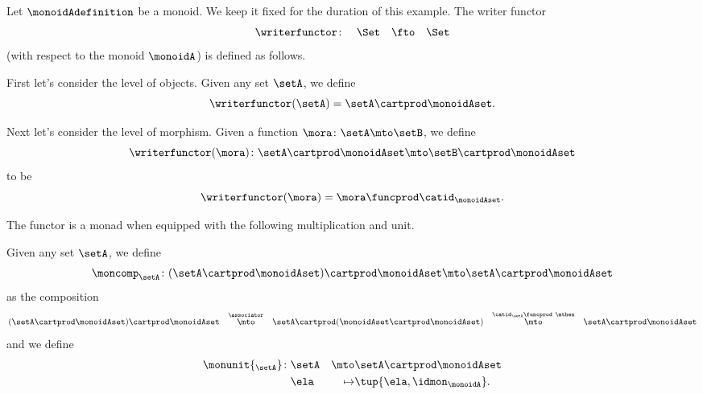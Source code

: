 \begin{example}

Let $\monoidAdefinition$ be a monoid. We keep it fixed for the duration of this example. The writer functor 
\begin{equation}
\writerfunctor \colon \quad \Set \quad \fto \quad \Set
\end{equation}
(with respect to the monoid $\monoidA$) is defined as follows. 

First let's consider the level of objects. Given any set $\setA$, we define 
\begin{equation}
\writerfunctor(\setA) = \setA \cartprod \monoidAset.
\end{equation}

Next let's consider the level of morphism. Given a function $\mora \colon \setA \mto \setB$, we define
\begin{equation}
\writerfunctor(\mora) \colon \setA \cartprod \monoidAset \mto \setB \cartprod \monoidAset
\end{equation}
to be 
\begin{equation}
\writerfunctor(\mora)  = \mora \funcprod \catid_\monoidAset.
\end{equation}

The functor is a monad when equipped with the following multiplication and unit.

Given any set $\setA$, we define 
\begin{equation}
        \moncomp_{\setA} \colon (\setA \cartprod \monoidAset) \cartprod \monoidAset \mto \setA \cartprod \monoidAset
    \end{equation}
as the composition
\begin{equation}
(\setA \cartprod \monoidAset) \cartprod \monoidAset \quad \overset{\associator}{\mto} \quad \setA \cartprod (\monoidAset \cartprod \monoidAset) \quad \overset{\catid_\setA \funcprod \ \mthen}{\mto} \quad \setA \cartprod \monoidAset
    \end{equation}
and we define 
    \begin{equation}
    \begin{aligned}
       \monunit{_\setA} \colon & \setA & \mto & \setA \cartprod \monoidAset \\
        & \ela & \mapsto & \tup{\ela, \idmon_\monoidA}.
       \end{aligned}
    \end{equation} 
\end{example}


